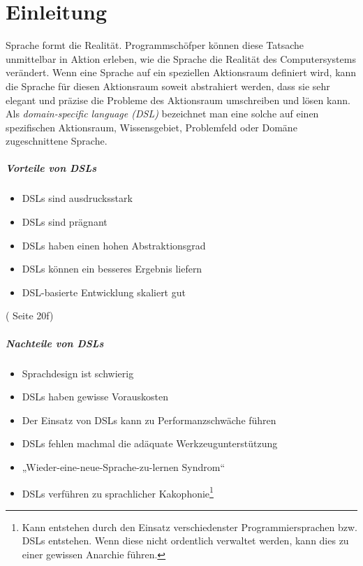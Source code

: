 \chapter{Einleitung}

Sprache formt die Realität. Programmschöfper können diese Tatsache unmittelbar
in Aktion erleben, wie die Sprache die Realität des Computersystems verändert.
Wenn eine Sprache auf ein speziellen Aktionsraum definiert wird, kann die
Sprache für diesen Aktionsraum soweit abstrahiert werden, dass sie sehr
elegant und präzise die Probleme des Aktionsraum umschreiben und lösen kann.
Als \emph{domain-specific language (DSL)} bezeichnet man eine solche auf
einen spezifischen Aktionsraum, Wissensgebiet, Problemfeld oder Domäne
zugeschnittene Sprache.

\paragraph{Vorteile von DSLs}

\begin{itemize}
  \item DSLs sind ausdrucksstark
  \item DSLs sind prägnant
  \item DSLs haben einen hohen Abstraktionsgrad
  \item DSLs können ein besseres Ergebnis liefern
  \item DSL-basierte Entwicklung skaliert gut
\end{itemize}

(\cite{dsls} Seite 20f)

\paragraph{Nachteile von DSLs}

\begin{itemize}
  \item Sprachdesign ist schwierig
  \item DSLs haben gewisse Vorauskosten
  \item Der Einsatz von DSLs kann zu Performanzschwäche führen
  \item DSLs fehlen machmal die adäquate Werkzeugunterstützung
  \item „Wieder-eine-neue-Sprache-zu-lernen Syndrom“
  \item DSLs verführen zu sprachlicher Kakophonie\footnote{
        Kann entstehen durch den Einsatz verschiedenster
        Programmiersprachen bzw. DSLs entstehen.
        Wenn diese nicht ordentlich verwaltet werden, kann
        dies zu einer gewissen Anarchie führen.}
\end{itemize}

